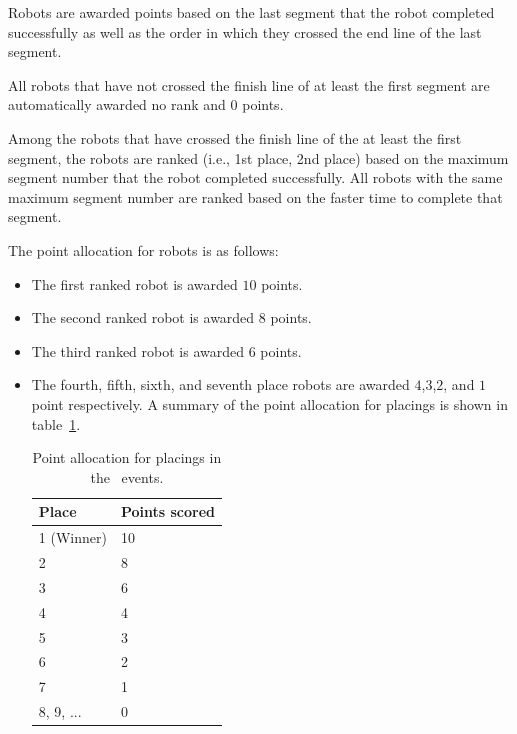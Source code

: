 \documentclass[12pt]{hurocup}
\begin{document}
\label{rd:scoring}

\begin{lawlist}[RD]

\item Robots are awarded points based on the last segment that the
robot completed successfully as well as the order in which they
crossed the end line of the last segment.

\item All robots that have not crossed the finish line of at least the
  first segment are automatically awarded no rank and $0$ points.

\item Among the robots that have crossed the finish line of the at
  least the first segment, the robots are ranked (i.e., 1st place, 2nd
  place) based on the maximum segment number that the robot completed
  successfully. All robots with the same maximum segment number are
  ranked based on the faster time to complete that segment.

\item The point allocation for robots is as follows:
  \begin{itemize}
  \item The first ranked robot is awarded $10$ points.
  \item The second ranked robot is awarded $8$ points.
  \item The third ranked robot is awarded $6$ points.
  \item The fourth, fifth, sixth, and seventh place robots are awarded
    $4$,$3$,$2$, and $1$ point respectively.  A summary of the point
    allocation for placings is shown in table~\ref{point-allocation}.

    \begin{table}
      \begin{center}
        \begin{tabular}{l|l}
          \hline
          Place & Points scored \\
          \hline
          1 (Winner) & 10 \\
          2          & 8 \\
          3          & 6 \\
          4          & 4 \\
          5          & 3 \\
          6          & 2 \\
          7          & 1 \\
          8, 9, ...  & 0 \\
          \hline
        \end{tabular}
      \end{center}
      \caption{Point allocation for placings in the \HuroCup\ events.}
      \label{point-allocation}
    \end{table}
  \end{itemize}


\end{lawlist}
\end{document}
